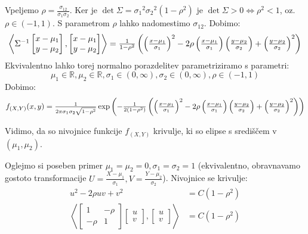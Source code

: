 \documentclass[12pt]{book}
\def\n{\noindent}
\theoremstyle{definition}
\theoremstyle{plain}
\theoremstyle{plain}
\theoremstyle{plain}
\theoremstyle{plain}
\theoremstyle{remark}
\begin{document}
\n Vpeljemo $\rho=\frac{\sigma_{12}}{\sigma_1 \sigma_2}$. Ker je $\det \Sigma=\sigma_1{ }^2 \sigma_2{ }^2\left(1-\rho^2\right)$ je $\det \Sigma >0 \iff \rho^2<1$, oz. $\rho \in(-1,1)$. S parametrom $\rho$ lahko nadomestimo $\sigma_{12}$. Dobimo: 
$$
\scalebox{1}{$\left\langle\Sigma^{-1}\begin{bmatrix} x - \mu_1 \\ y - \mu_2 \end{bmatrix},\begin{bmatrix} x - \mu_1 \\ y - \mu_2 \end{bmatrix}\right\rangle = \frac{1}{1-\rho^2}\left(\left(\frac{x-\mu_1}{\sigma_1}\right)^2-2 \rho\left(\frac{x-\mu_1}{\sigma_1}\right)\left(\frac{y-\mu_2}{\sigma_2}\right)+\left(\frac{y-\mu_2}{\sigma_2}\right)^2\right)$}
$$
Ekvivalentno lahko torej normalno porazdelitev parametriziramo s parametri:
$$
\mu_1 \in \mathbb{R}, \mu_2 \in \mathbb{R}, \sigma_1 \in(0, \infty), \sigma_2 \in(0, \infty), \rho \in(-1,1)
$$
Dobimo: 
$$
\scalebox{1}{$f_{(X, Y)}(x, y)=\frac{1}{2 \pi \sigma_1 \sigma_2 \sqrt{1-\rho^2}} \exp\left(-\frac{1}{2\left(1-\rho^2\right)}\left(\left(\frac{x-\mu_1}{\sigma_1}\right)^2-2 \rho\left(\frac{x-\mu_1}{\sigma_1}\right)\left(\frac{y-\mu_2}{\sigma_2}\right)+\left(\frac{y-\mu_2}{\sigma_2}\right)^2\right)\right)$}
$$

\n Vidimo, da so nivojnice funkcije $f_{(X,Y)}$ krivulje, ki so elipse s središčem v $(\mu_1, \mu_2)$.

\n Oglejmo si poseben primer $\mu_1=\mu_2=0, \sigma_1=\sigma_2=1$ (ekvivalentno, obravnavamo gostoto transformacije $U=\frac{X-\mu_1}{\sigma_1}, V=\frac{Y-\mu_2}{\sigma_2}$). Nivojnice se krivulje: 
$$
\begin{aligned}
    u^2-2 \rho u v+v^2&=C\left(1-\rho^2\right) \\ 
    \left\langle\begin{bmatrix} 1 & -\rho \\ -\rho & 1 \end{bmatrix} \begin{bmatrix} u \\ v \end{bmatrix},\begin{bmatrix} u \\ v \end{bmatrix}\right\rangle&=C\left(1-\rho^2\right)
\end{aligned}
$$

\newpage
\end{document}
